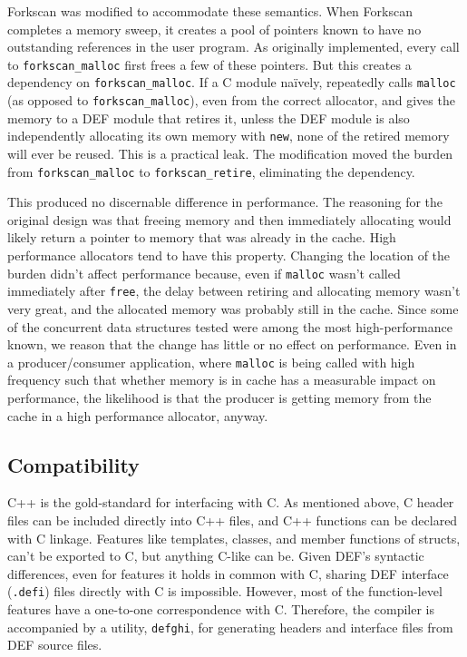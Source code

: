 Forkscan was modified to accommodate these semantics.  When Forkscan completes a memory sweep, it creates a pool of pointers known to have no outstanding references in the user program.  As originally implemented, every call to \texttt{forkscan\_{}malloc} first frees a few of these pointers.  But this creates a dependency on \texttt{forkscan\_{}malloc}.  If a C module na\"ively, repeatedly calls \texttt{malloc} (as opposed to \texttt{forkscan\_{}malloc}), even from the correct allocator, and gives the memory to a DEF module that retires it, unless the DEF module is also independently allocating its own memory with \texttt{new}, none of the retired memory will ever be reused.  This is a practical leak.  The modification moved the burden from \texttt{forkscan\_{}malloc} to \texttt{forkscan\_retire}, eliminating the dependency.

This produced no discernable difference in performance.  The reasoning for the original design was that freeing memory and then immediately allocating would likely return a pointer to memory that was already in the cache.  High performance allocators tend to have this property.  Changing the location of the burden didn't affect performance because, even if \texttt{malloc} wasn't called immediately after \texttt{free}, the delay between retiring and allocating memory wasn't very great, and the allocated memory was probably still in the cache.  Since some of the concurrent data structures tested were among the most high-performance known, we reason that the change has little or no effect on performance.  Even in a producer/consumer application, where \texttt{malloc} is being called with high frequency such that whether memory is in cache has a measurable impact on performance, the likelihood is that the producer is getting memory from the cache in a high performance allocator, anyway.

\subsection{Compatibility}

C++ is the gold-standard for interfacing with C.  As mentioned above, C header files can be included directly into C++ files, and C++ functions can be declared with C linkage.  Features like templates, classes, and member functions of structs, can't be exported to C, but anything C-like can be.  Given DEF's syntactic differences, even for features it holds in common with C, sharing DEF interface (\texttt{.defi}) files directly with C is impossible.  However, most of the function-level features have a one-to-one correspondence with C.  Therefore, the compiler is accompanied by a utility, \texttt{defghi}, for generating headers and interface files from DEF source files.

